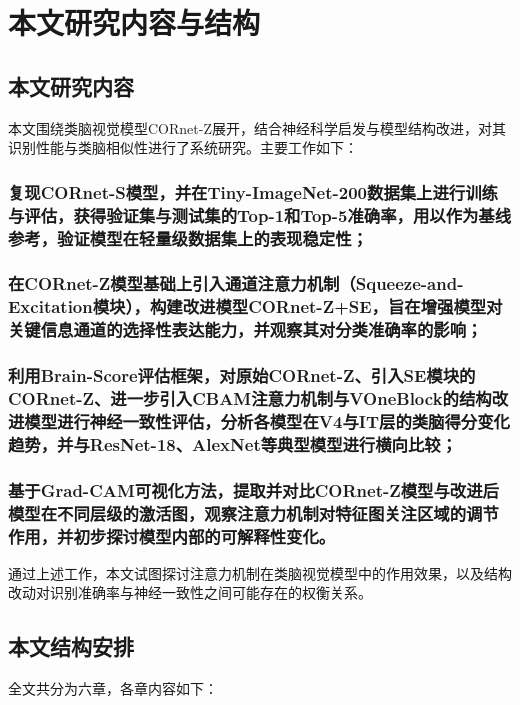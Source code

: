 \section{本文研究内容与结构}

\subsection{本文研究内容}

本文围绕类脑视觉模型CORnet-Z展开，结合神经科学启发与模型结构改进，对其识别性能与类脑相似性进行了系统研究。主要工作如下：

\subsubsection{复现CORnet-S模型，并在Tiny-ImageNet-200数据集上进行训练与评估，获得验证集与测试集的Top-1和Top-5准确率，用以作为基线参考，验证模型在轻量级数据集上的表现稳定性；}

\subsubsection{在CORnet-Z模型基础上引入通道注意力机制（Squeeze-and-Excitation模块），构建改进模型CORnet-Z+SE，旨在增强模型对关键信息通道的选择性表达能力，并观察其对分类准确率的影响；}

\subsubsection{利用Brain-Score评估框架，对原始CORnet-Z、引入SE模块的CORnet-Z、进一步引入CBAM注意力机制与VOneBlock的结构改进模型进行神经一致性评估，分析各模型在V4与IT层的类脑得分变化趋势，并与ResNet-18、AlexNet等典型模型进行横向比较；}

\subsubsection{基于Grad-CAM可视化方法，提取并对比CORnet-Z模型与改进后模型在不同层级的激活图，观察注意力机制对特征图关注区域的调节作用，并初步探讨模型内部的可解释性变化。}

通过上述工作，本文试图探讨注意力机制在类脑视觉模型中的作用效果，以及结构改动对识别准确率与神经一致性之间可能存在的权衡关系。

\subsection{本文结构安排}

全文共分为六章，各章内容如下：


